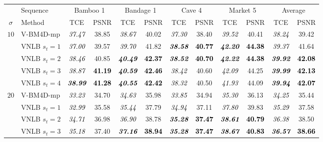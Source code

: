 \documentclass[10pt, journal, twocolumn, final, a4paper]{IEEEtran}
\newcommand{\bsic}[1]{\textcolor{black}{\textit{#1}}}
\newcommand{\Bsic}[1]{\textcolor{black}{\textbf{\textit{#1}}}}
\newcommand{\Best}[1]{\textbf{\textcolor{black}{#1}}}
\begin{document}
\begin{table}[htp!]
\begin{center}
{\begin{tabular}{ c | l |c c | c c | c c | c c | c c}
			\hline
			\rule{0pt}{10pt}         & Sequence          &\multicolumn{2}{c|}{Bamboo 1}&\multicolumn{2}{c|}{Bandage 1}&\multicolumn{2}{c|}{Cave 4} &\multicolumn{2}{c|}{Market 5}& \multicolumn{2}{c}{Average} \\
			\rule{0pt}{10pt}$\sigma$ & Method            & TCE          & PSNR         & TCE          & PSNR         & TCE          & PSNR         & TCE          & PSNR         & TCE          & PSNR         \\\hline
			\multirow{1}{*}{$10$}
			                      & V-BM4D-mp            & \bsic{37.47} &       38.85  & \bsic{38.67} &       40.02  & \bsic{37.30} &       38.40  & \bsic{39.52} &       40.41  & \bsic{38.24} &       39.42  \\
			                      & VNLB   $s_t = 1$     & \bsic{37.00} &       39.57  & \bsic{39.70} &       41.82  & \Bsic{38.58} & \Best{40.77} & \Bsic{42.20} & \Best{44.38} & \bsic{39.37} &       41.64  \\
										 & VNLB   $s_t = 2$     & \bsic{38.46} &       40.85  & \Bsic{40.49} & \Best{42.37} & \Bsic{38.52} & \Best{40.70} & \Bsic{42.22} & \Best{44.38} & \Bsic{39.92} & \Best{42.08} \\
			                      & VNLB   $s_t = 3$     & \bsic{38.87} & \Best{41.19} & \Bsic{40.59} & \Best{42.46} & \bsic{38.42} &       40.60  & \bsic{42.09} &       44.25  & \Bsic{39.99} & \Best{42.13} \\
										 & VNLB   $s_t = 4$     & \Bsic{38.99} & \Best{41.28} & \Bsic{40.55} & \Best{42.42} & \bsic{38.32} &       40.50  & \bsic{41.93} &       44.09  & \Bsic{39.94} & \Best{42.07} \\\hline
%
			\multirow{1}{*}{$20$}
			                      & V-BM4D-mp            & \bsic{33.23} &       34.70  & \bsic{34.63} &       35.98  & \bsic{33.85} &       34.94  & \bsic{35.30} &       36.13  & \bsic{34.25} &       35.44  \\
			                      & VNLB   $s_t = 1$     & \bsic{32.99} &       35.58  & \bsic{35.44} &       37.79  & \bsic{34.94} &       37.11  & \bsic{37.80} &       39.83  & \bsic{35.29} &       37.58  \\
			                      & VNLB   $s_t = 2$     & \bsic{34.71} &       36.98  & \bsic{36.90} &       38.78  & \Bsic{35.28} & \Best{37.47} & \Bsic{38.61} & \Best{40.79} & \bsic{36.38} &       38.50  \\
			                      & VNLB   $s_t = 3$     & \bsic{35.18} &       37.40  & \Bsic{37.16} & \Best{38.94} & \Bsic{35.28} & \Best{37.47} & \Bsic{38.67} & \Best{40.83} & \Bsic{36.57} & \Best{38.66} \\

\end{tabular}}
\end{center}
\end{table}
\end{document}
